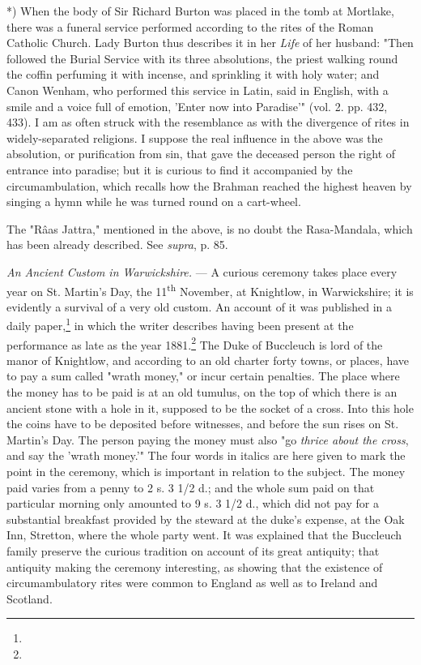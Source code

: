 \documentclass[a4paper, 11pt, oneside, polutonikogreek, english]{article}
\begin{document}
*) When the body of Sir Richard Burton was placed in the tomb at Mortlake, there was a funeral service performed according to the rites of the Roman Catholic Church. Lady Burton thus describes it in her \emph{Life} of her husband: "Then followed the Burial Service with its three absolutions, the priest walking round the coffin perfuming it with incense, and sprinkling it with holy water; and Canon Wenham, who performed this service in Latin, said in English, with a smile and a voice full of emotion, 'Enter now into Paradise'" (vol. 2. pp. 432, 433). I am as often struck with the resemblance as with the divergence of rites in widely-separated religions. I suppose the real influence in the above was the absolution, or purification from sin, that gave the deceased person the right of entrance into paradise; but it is curious to find it accompanied by the circumambulation, which recalls how the Brahman reached the highest heaven by singing a hymn while he was turned round on a cart-wheel.

The "Râas Jattra," mentioned in the above, is no doubt the Rasa-Mandala, which has been already described. See \emph{supra}, p. 85.

\emph{An Ancient Custom in Warwickshire.} --- A curious ceremony takes place every year on St. Martin's Day, the 11\textsuperscript{th} November, at Knightlow, in Warwickshire; it is evidently a survival of a very old custom. An account of it was published in a daily paper,\footnote{} in which the writer describes having been present at the performance as late as the year 1881.\footnote{} The Duke of Buccleuch is lord of the manor of Knightlow, and according to an old charter forty towns, or places, have to pay a sum called "wrath money," or incur certain penalties. The place where the money has to be paid is at an old tumulus, on the top of which there is an ancient stone with a hole in it, supposed to be the socket of a cross. Into this hole the coins have to be deposited before witnesses, and before the sun rises on St. Martin's Day. The person paying the money must also "go \emph{thrice about the cross}, and say the 'wrath money.'" The four words in italics are here given to mark the point in the ceremony, which is important in relation to the subject. The money paid varies from a penny to 2 s. 3 1/2 d.; and the whole sum paid on that particular morning only amounted to 9 s. 3 1/2 d., which did not pay for a substantial breakfast provided by the steward at the duke's expense, at the Oak Inn, Stretton, where the whole party went. It was explained that the Buccleuch family preserve the curious tradition on account of its great antiquity; that antiquity making the ceremony interesting, as showing that the existence of circumambulatory rites were common to England as well as to Ireland and Scotland.
\end{document}
